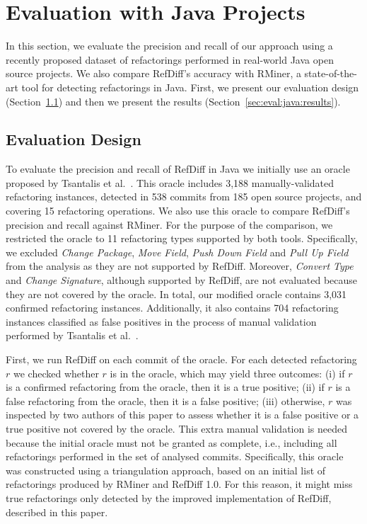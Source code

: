 \section{Evaluation with Java Projects}

In this section, we evaluate the precision and recall of our approach using a recently proposed dataset of refactorings performed in real-world Java open source projects. We also compare RefDiff's accuracy with RMiner, 
a state-of-the-art tool for detecting refactorings in Java.
First, we present our evaluation design (Section~\ref{sec:eval:java:design}) and then we present the results (Section~\ref{sec:eval:java:results}).

\subsection{Evaluation Design}
\label{sec:eval:java:design}

To evaluate the precision and recall of RefDiff in Java we initially use an oracle proposed by Tsantalis et al.~\cite{tsantalis2018rminer}.
This oracle includes 3,188 manually-validated refactoring instances, detected in 538 commits from 185 open source projects, and covering 15 refactoring operations.
We also use this oracle to compare RefDiff's precision and recall against RMiner.
For the purpose of the comparison, we restricted the oracle to 11 refactoring types supported by both tools.
Specifically, we excluded \emph{Change Package}, \emph{Move Field}, \emph{Push Down Field} and \emph{Pull Up Field} from the analysis as they are not supported by RefDiff.
Moreover, \emph{Convert Type} and \emph{Change Signature}, although supported by RefDiff, are not evaluated because they are not covered by the oracle.
In total, our modified oracle contains 3,031 confirmed refactoring instances.
Additionally, it also contains 704 refactoring instances classified as false positives in the process of manual validation performed by Tsantalis et al.~\cite{tsantalis2018rminer}.

First, we run RefDiff on each commit of the oracle. For each detected refactoring $r$ we checked whether $r$ is in the oracle, which may yield three outcomes: (i) if $r$ is a confirmed refactoring from the oracle, then it is a true positive; (ii) if $r$ is a false refactoring from the oracle, then it is a false positive; (iii) otherwise, $r$ was inspected by two authors of this paper to assess whether it is a false positive or a true positive not covered by the oracle.
This extra manual validation is needed because the initial oracle must not be granted as complete, i.e., including all refactorings performed in the set of analysed commits.
Specifically, this oracle was constructed using a triangulation approach, based on an initial list of refactorings produced by RMiner and RefDiff 1.0. For this reason, it might miss true refactorings only detected by the improved implementation of RefDiff, described in this paper.

